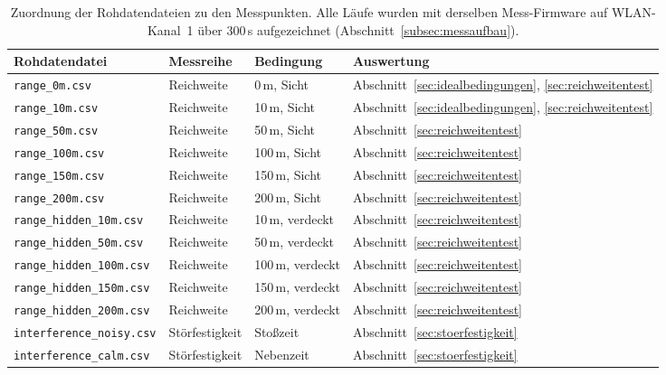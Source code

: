 \begin{table}[H]
    \centering
    \small
    \caption{Zuordnung der Rohdatendateien zu den Messpunkten. Alle Läufe wurden
        mit derselben Mess-Firmware auf WLAN-Kanal~1 über 300\,s aufgezeichnet
        (Abschnitt~\ref{subsec:messaufbau}).}
    \label{tab:messlaeufe}
    \begin{tabular}{llll}
        \toprule
        Rohdatendatei & Messreihe & Bedingung & Auswertung \\
        \midrule
        \texttt{range\_0m.csv}          & Reichweite & 0\,m, Sicht    & Abschnitt~\ref{sec:idealbedingungen}, \ref{sec:reichweitentest} \\
        \texttt{range\_10m.csv}         & Reichweite & 10\,m, Sicht   & Abschnitt~\ref{sec:idealbedingungen}, \ref{sec:reichweitentest} \\
        \texttt{range\_50m.csv}         & Reichweite & 50\,m, Sicht   & Abschnitt~\ref{sec:reichweitentest} \\
        \texttt{range\_100m.csv}        & Reichweite & 100\,m, Sicht  & Abschnitt~\ref{sec:reichweitentest} \\
        \texttt{range\_150m.csv}        & Reichweite & 150\,m, Sicht  & Abschnitt~\ref{sec:reichweitentest} \\
        \texttt{range\_200m.csv}        & Reichweite & 200\,m, Sicht  & Abschnitt~\ref{sec:reichweitentest} \\
        \midrule
        \texttt{range\_hidden\_10m.csv}  & Reichweite & 10\,m, verdeckt  & Abschnitt~\ref{sec:reichweitentest} \\
        \texttt{range\_hidden\_50m.csv}  & Reichweite & 50\,m, verdeckt  & Abschnitt~\ref{sec:reichweitentest} \\
        \texttt{range\_hidden\_100m.csv} & Reichweite & 100\,m, verdeckt & Abschnitt~\ref{sec:reichweitentest} \\
        \texttt{range\_hidden\_150m.csv} & Reichweite & 150\,m, verdeckt & Abschnitt~\ref{sec:reichweitentest} \\
        \texttt{range\_hidden\_200m.csv} & Reichweite & 200\,m, verdeckt & Abschnitt~\ref{sec:reichweitentest} \\
        \midrule
        \texttt{interference\_noisy.csv} & Störfestigkeit & Stoßzeit  & Abschnitt~\ref{sec:stoerfestigkeit} \\
        \texttt{interference\_calm.csv}  & Störfestigkeit & Nebenzeit & Abschnitt~\ref{sec:stoerfestigkeit} \\
        \bottomrule
    \end{tabular}
\end{table}

